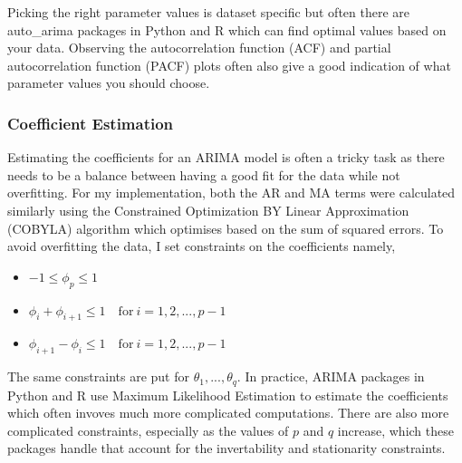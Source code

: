 \documentclass{article}
\begin{document}
  Picking the right parameter values is dataset specific but often there are auto\_arima packages in Python and R which can find optimal values based on your data. Observing the autocorrelation function (ACF) and partial autocorrelation function (PACF) plots often also give a good indication of what parameter values you should choose.

  \subsubsection{Coefficient Estimation}
  Estimating the coefficients for an ARIMA model is often a tricky task as there needs to be a balance between having a good fit for the data while not overfitting. For my implementation, both the AR and MA terms were calculated similarly using the Constrained Optimization BY Linear Approximation (COBYLA) algorithm which optimises based on the sum of squared errors. To avoid overfitting the data, I set constraints on the coefficients namely,
  \begin{itemize}
    \item $-1 \leq \phi_p \leq 1$
    \item $\phi_i + \phi_{i+1} \leq 1 \quad \text{for} \ i=1,2,...,p-1$
    \item $\phi_{i+1} - \phi_i \leq 1 \quad \text{for} \ i=1,2,...,p-1$
  \end{itemize}
  
  The same constraints are put for $\theta_1,...,\theta_q$. In practice, ARIMA packages in Python and R use Maximum Likelihood Estimation to estimate the coefficients which often invoves much more complicated computations. There are also more complicated constraints, especially as the values of $p$ and $q$ increase, which these packages handle that account for the invertability and stationarity constraints.
\end{document}
